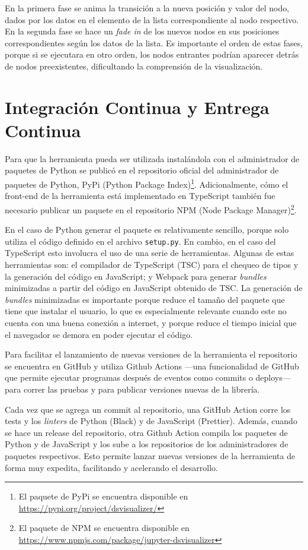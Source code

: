 En la primera fase se anima la transición a la nueva posición y valor del nodo, dados por los datos en el elemento de la lista correspondiente al nodo respectivo. En la segunda fase se hace un \textit{fade in} de los nuevos nodos en sus posiciones correspondientes según los datos de la lista. Es importante el orden de estas fases, porque si se ejecutara en otro orden, los nodos entrantes podrían aparecer detrás de nodos preexistentes, dificultando la comprensión de la visualización.

\section{Integración Continua y Entrega Continua}

Para que la herramienta pueda ser utilizada instalándola con el administrador de paquetes de Python se publicó en el repositorio oficial del administrador de paquetes de Python, PyPi (Python Package Index)\footnote{El paquete de PyPi se encuentra disponible en \url{https://pypi.org/project/dsvisualizer/}}. Adicionalmente, cómo el front-end de la herramienta está implementado en TypeScript también fue necesario publicar un paquete en el repositorio NPM (Node Package Manager)\footnote{El paquete de NPM se encuentra disponible en \url{https://www.npmjs.com/package/jupyter-dsvisualizer}}.

En el caso de Python generar el paquete es relativamente sencillo, porque solo utiliza el código definido en el archivo \texttt{setup.py}. En cambio, en el caso del TypeScript esto involucra el uso de una serie de herramientas. Algunas de estas herramientas son: el compilador de TypeScript (TSC) para el chequeo de tipos y la generación del código en JavaScript; y Webpack para generar \textit{bundles} minimizadas a partir del código en JavaScript obtenido de TSC. La generación de \textit{bundles} minimizadas es importante porque reduce el tamaño del paquete que tiene que instalar el usuario, lo que es especialmente relevante cuando este no cuenta con una buena conexión a internet, y porque reduce el tiempo inicial que el navegador se demora en poder ejecutar el código.

Para facilitar el lanzamiento de nuevas versiones de la herramienta el repositorio se encuentra en GitHub y utiliza Github Actions ---una funcionalidad de GitHub que permite ejecutar programas después de eventos como commits o deploys--- para correr las pruebas y para publicar versiones nuevas de la librería.

Cada vez que se agrega un commit al repositorio, una GitHub Action corre los tests y los \textit{linters} de Python (Black) y de JavaScript (Prettier). Además, cuando se hace un release del repositorio, otra Github Action compila los paquetes de Python y de JavaScript y los sube a los repositorios de los administradores de paquetes respectivos. Esto permite lanzar nuevas versiones de la herramienta de forma muy expedita, facilitando y acelerando el desarrollo.

